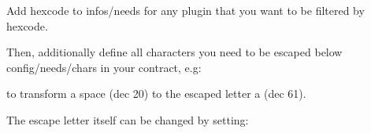 Add {\ttfamily hexcode} to {\ttfamily infos/needs} for any plugin that you want to be filtered by hexcode.

Then, additionally define all characters you need to be escaped below {\ttfamily config/needs/chars} in your contract, e.\+g\+:


\begin{DoxyCode}{0}
\end{DoxyCode}


to transform a space (dec 20) to the escaped letter a (dec 61).

The escape letter itself can be changed by setting\+:


\begin{DoxyCode}{0}
\end{DoxyCode}
 
